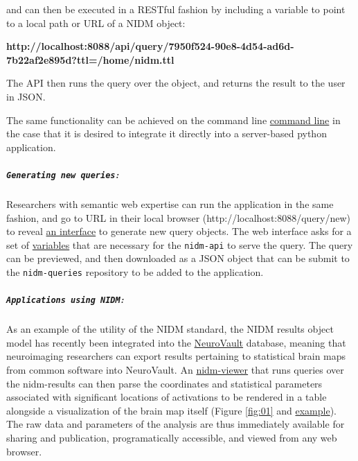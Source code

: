 \documentclass[twocolumn]{bmcart}%
\begin{document}
and can then be executed in a RESTful fashion by including a variable to point to a local path or URL of a NIDM object:\newline

\textbf{http://localhost:8088/api/query/7950f524-90e8-4d54-ad6d-7b22af2e895d?ttl=/home/nidm.ttl}\newline

The API then runs the query over the object, and returns the result to the user in JSON.

The same functionality can be achieved on the command line \href{http://nidm-api.readthedocs.org/en/latest/getting-started.html#integration-into-python}{command line} in the case that it is desired to integrate it directly into a server-based python application.\newline

\subparagraph{\texorpdfstring{\texttt{Generating new queries}:}{:}}\label{section}
Researchers with semantic web expertise can run the application in the same fashion, and go to URL in their local browser (http://localhost:8088/query/new) to reveal \href{http://nidm-api.readthedocs.org/en/latest/development.html#web-query-generator}{an interface} to generate new query objects. The web interface asks for a set of \href{http://nidm-api.readthedocs.org/en/latest/development.html#fields}{variables} that are necessary for the \texttt{nidm-api} to serve the query. The query can be previewed, and then downloaded as a JSON object that can be submit to the \texttt{nidm-queries} repository to be added to the application.\newline

\subparagraph{\texorpdfstring{\texttt{Applications using NIDM}:}{:}}\label{section}
As an example of the utility of the NIDM standard, the NIDM results object model \cite{noauthor_undated-if} has recently been integrated into the \href{http://www.neurovault.org}{NeuroVault} database, meaning that neuroimaging researchers can export results pertaining to statistical brain maps from common software \cite{Jenkinson2012-pr} into NeuroVault. An \href{https://github.com/vsoch/nidmviewer}{nidm-viewer} that runs queries over the nidm-results can then parse the coordinates and statistical parameters associated with significant locations of activations to be rendered in a table alongside a visualization of the brain map itself (Figure \ref{fig:01} and \href{http://neurovault.org/collections/877/fsl_course_av.nidm}{example}). The raw data and parameters of the analysis are thus immediately available for sharing and publication, programatically accessible, and viewed from any web browser. 
\end{document}
